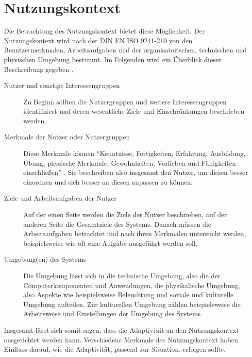 \documentclass[12pt, paper=a4, bibtotoc, toc=listof, headsepline=true, numbers=endperiod]{scrreprt}
\begin{document}
	\section{Nutzungskontext}
	Die Betrachtung des Nutzungskontext bietet diese Möglichkeit. Der Nutzungskontext wird nach der DIN EN ISO 9241-210 von den Benutzermerkmalen, Arbeitsaufgaben und der organisatorischen, technischen und physischen Umgebung bestimmt. Im Folgenden wird ein Überblick dieser Beschreibung gegeben \cite[S.15 ff.]{hoffmann2014venus}.
	\begin{description}  
		\item  [Nutzer und sonstige Interessengruppen] 
		Zu Beginn sollten die Nutzergruppen und weitere Interessengruppen identifiziert und deren wesentliche Ziele und Einschränkungen beschrieben werden.
			
		\item [Merkmale der Nutzer oder Nutzergruppen]
		Diese Merkmale können \enquote{Kenntnisse, Fertigkeiten, Erfahrung, Ausbildung, Übung, physische Merkmale, Gewohnheiten, Vorlieben und Fähigkeiten einschließen} \cite[S.16]{hoffmann2014venus}. Sie beschreiben also insgesamt den Nutzer, um diesen besser einordnen und sich besser an diesen anpassen zu können.
		
		\item  [Ziele und Arbeitsaufgaben der Nutzer]
		Auf der einen Seite werden die Ziele der Nutzer beschrieben, auf der anderen Seite die Gesamtziele des Systems. Danach müssen die Arbeitsaufgaben betrachtet und nach ihren Merkmalen untersucht werden, beispielsweise wie oft eine Aufgabe ausgeführt werden soll.
			
		\item [Umgebung(en) des Systems]
		Die Umgebung lässt sich in die technische Umgebung, also die der Computerkomponenten und Anwendungen, die physikalische Umgebung, also Aspekte wie beispielsweise Beleuchtung und soziale und kulturelle Umgebung aufteilen. Zur kulturellen Umgebung zählen beispielsweise die Arbeitsweise und Einstellungen der Umgebung des Systems.
	\end{description}
	Insgesamt lässt sich somit sagen, dass die Adaptivität an den Nutzungskontext ausgerichtet werden kann. Verschiedene Merkmale des Nutzungskontext haben Einfluss darauf, wie die Adaptivität, passend zur Situation, erfolgen sollte.
\end{document}
